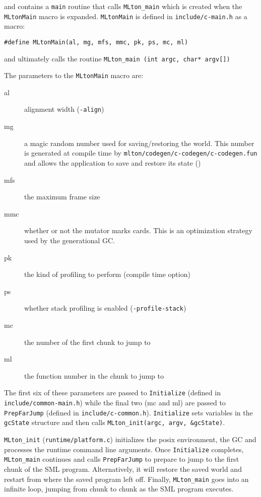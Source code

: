 \noindent and contains a \texttt{main} routine that calls \texttt{MLton\_main} which is created when the \texttt{MLtonMain} macro is expanded. 
\texttt{MLtonMain} is defined in \texttt{include/c-main.h} as a macro:

\begin{minipage}{\linewidth}
\lstset{language=C}\begin{lstlisting}
#define MLtonMain(al, mg, mfs, mmc, pk, ps, mc, ml)	
\end{lstlisting}
\end{minipage}

and ultimately calls the routine \texttt{MLton\_main (int argc, char* argv[])} 

The parameters to the \texttt{MLtonMain} macro are:


\begin{description}
\item[al] alignment width (\texttt{-align})
\item[mg] a magic random number used for saving/restoring the world. This number is generated at compile time by \texttt{mlton/codegen/c-codegen/c-codegen.fun} and allows the application to save and restore its state ()
\item[mfs] the maximum frame size
\item[mmc] whether or not the mutator marks cards. This is an optimization strategy used by the generational GC.
\item[pk] the kind of profiling to perform (compile time option)
\item[ps] whether stack profiling is enabled (\texttt{-profile-stack})
\item[mc] the number of the first chunk to jump to
\item[ml] the function number in the chunk to jump to
\end{description}

The first six of these parameters are passed to \texttt{Initialize} (defined in \texttt{include/common-main.h}) while the final two (mc and ml) are passed to \texttt{PrepFarJump} (defined in \texttt{include/c-common.h}). 
\texttt{Initialize} sets variables in the \texttt{gcState} structure and then calls \texttt{MLton\_init(argc, argv, \&gcState)}.



\texttt{MLton\_init} (\texttt{runtime/platform.c}) initializes the posix environment, the GC and processes the runtime command line arguments.  Once \texttt{Initialize} completes, \texttt{MLton\_main} continues and calls \texttt{PrepFarJump} to prepare to jump to the first chunk of the SML program. Alternatively, it will restore the saved world and restart from where the saved program left off. Finally, \texttt{MLton\_main} goes into an infinite loop, jumping from chunk to chunk as the SML program executes.

